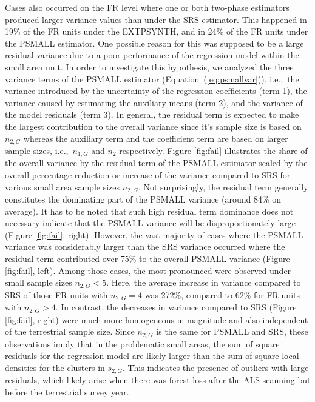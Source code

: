 \documentclass[remotesensing,article,accept,moreauthors,pdftex,10pt,a4paper]{Definitions/mdpi}
\newcommand{\psmall}{PSMALL}
\newcommand{\extpsynth}{EXTPSYNTH}
\begin{document}
\vspace{-6pt}
Cases also occurred on the FR level where one or both two-phase estimators produced larger variance values than under the SRS estimator. This happened in 19\% of the FR units under the \extpsynth{}, and in 24\% of the FR units under the \psmall{} estimator. One possible reason for this was supposed to be a large residual variance due to a poor performance of the regression model within the small area unit. In order to investigate this hypothesis, we analyzed the three variance terms of the \psmall{} estimator (Equation~(\ref{eq:psmallvar})), i.e.,~the variance introduced by the uncertainty of the regression coefficients (term 1), the variance caused by estimating the auxiliary means (term 2), and the variance of the model residuals (term 3). In general, the residual term is expected to make the largest contribution to the overall variance since it's sample size is based on $n_{2,G}$ whereas the auxiliary term and the coefficient term are based on larger sample sizes, i.e.,~$n_{1,G}$ and $n_2$ respectively. Figure \ref{fig:fail} illustrates the share of the overall variance by the residual term of the \psmall{} estimator scaled by the overall percentage reduction or increase of the variance compared to SRS for various small area sample sizes $n_{2,G}$. Not surprisingly, the residual term generally constitutes the dominating part of the \psmall{} variance (around 84\% on average). It has to be noted that such high residual term dominance does not necessary indicate that the \psmall{} variance will be disproportionately large (Figure \ref{fig:fail}, {right}). However, the vast majority of cases where the \psmall{} variance was considerably larger than the SRS variance occurred where the residual term contributed over 75\% to the overall \psmall{} variance (Figure \ref{fig:fail}, {left}). Among those cases, the most pronounced were observed under small sample sizes $n_{2,G} < 5$. Here, the average increase in variance compared to SRS of those FR units with $n_{2,G} = 4$ was 272\%, compared to 62\% for FR units with $n_{2,G} > 4$. In contrast, the decreases in variance compared to SRS (Figure \ref{fig:fail}, {right}) were much more homogeneous in magnitude and also independent of the terrestrial sample size. Since $n_{2,G}$ is the same for \psmall{} and SRS, these observations imply that in the problematic small areas, the sum of square residuals for the regression model are likely larger than the sum of square local densities for the clusters in $s_{2,G}$. This indicates the presence of outliers with large residuals, which likely arise when there was forest loss after the ALS scanning but before the terrestrial survey year. %
\end{document}
